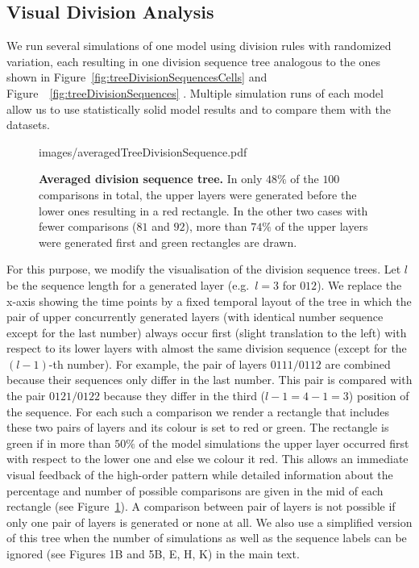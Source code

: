 \documentclass[11pt,a4paper, final]{article}
\begin{document}
\subsection{Visual Division Analysis}
\label{sec:visualAnalysis}
\noindent
We run several simulations of one model using division rules with randomized variation, each resulting in one division sequence tree analogous to the ones shown in Figure~\ref{fig:treeDivisionSequencesCells} and Figure~~\ref{fig:treeDivisionSequences} . Multiple simulation runs of each model allow us to use statistically solid model results and to compare them with the datasets.
%
\begin{figure}[htbp]
	\begin{center}
		\begin{overpic}[width=0.4\linewidth]{images/averagedTreeDivisionSequence.pdf}
		\end{overpic}
\caption[]
{
{\bf Averaged division sequence tree.} In only $48 \%$ of the $100$ comparisons in total, the upper layers were generated before the lower ones resulting in a red rectangle. In the other two cases with fewer comparisons ($81$ and $92$), more than $74 \%$ of the upper layers were generated first and green rectangles are drawn.
}
	\label{fig:averagedTreeDivisionSequence}
	\end{center}
\end{figure}
%
For this purpose, we modify the visualisation of the division sequence trees. Let $l$ be the sequence length for a generated layer (e.g.\ $l=3$ for $012$). We replace the x-axis showing the time points by a fixed temporal layout of the tree in which the pair of upper concurrently generated layers (with identical number sequence except for the last number) always occur first (slight translation to the left) with respect to its lower layers with almost the same division sequence (except for the $(l-1)$-th number). For example, the pair of layers $0111/0112$ are combined because their sequences only differ in the last number. This pair is compared with the pair $0121/0122$ because they differ in the third ($l-1 = 4-1 = 3$) position of the sequence. For each such a comparison we render a rectangle that includes these two pairs of layers and its colour is set to red or green. The rectangle is green if in more than $50 \%$ of the model simulations the upper layer occurred first with respect to the lower one and else we colour it red. This allows an immediate visual feedback of the high-order pattern while detailed information about the percentage and number of possible comparisons are given in the mid of each rectangle (see Figure~\ref{fig:averagedTreeDivisionSequence}). A comparison between pair of layers is not possible if only one pair of layers is generated or none at all. We also use a simplified version of this tree when the number of simulations as well as the sequence labels can be ignored (see Figures 1B and 5B, E, H, K) in the main text.
\end{document}
